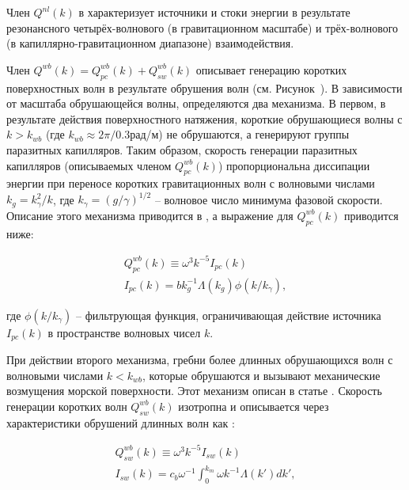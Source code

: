 Член $Q^{nl} (k)$ в  характеризует источники и стоки энергии в результате резонансного четырёх-волнового (в гравитационном масштабе) и трёх-волнового (в капиллярно-гравитационном диапазоне) взаимодействия.

Член $Q^{wb} (k)=Q_{pc}^{wb} (k)+Q_{sw}^{wb} (k)$ описывает генерацию коротких поверхностных волн в результате обрушения волн (см. Рисунок~). В зависимости от масштаба обрушающейся волны, определяются два механизма. В первом, в результате действия поверхностного натяжения, короткие обрушающиеся волны с $k>k_{wb} $ (где $k_{wb} \approx 2\pi /0.3$рад/м) не обрушаются, а генерируют группы паразитных капилляров. Таким образом, скорость генерации паразитных капилляров (описываемых членом $Q_{pc}^{wb} (k)$) пропорциональна диссипации энергии при переносе коротких гравитационных волн с волновыми числами $k_{g} =k_{\gamma }^{2} /k$, где $k_{\gamma } =(g/\gamma )^{1/2} $ -- волновое число минимума фазовой скорости. Описание этого механизма приводится в \citep{1999a,Kudryavtsev2003}, а выражение для $Q_{pc}^{wb} (k)$ приводится ниже:



\begin{equation} \label{1.34)} \begin{array}{l} {Q_{pc}^{wb} (k)\equiv \omega ^{3} k^{-5} I_{pc} (k)} \\ {I_{pc} (k)=bk_{g}^{-1} \Lambda (k_{g} )\phi (k/k_{\gamma } ),} \end{array} \end{equation} 



\noindent где $\phi (k/k_{\gamma } )$ -- фильтрующая функция, ограничивающая действие источника $I_{pc} (k)$ в пространстве волновых чисел $k$.

При действии второго механизма, гребни более длинных обрушающихся волн с волновыми числами $k<k_{wb} $, которые обрушаются и вызывают механические возмущения морской поверхности. Этот механизм описан в статье \citep{Kudryavtsev2004}. Скорость генерации коротких волн $Q_{sw}^{wb} (k)$ изотропна и описывается через характеристики обрушений длинных волн как \citep{Kudryavtsev2004}:



\begin{equation} \label{1.35)} \begin{array}{l} {Q_{sw}^{wb} (k)\equiv \omega ^{3} k^{-5} I_{sw} (k)} \\ {I_{sw} (k)=c_{b} \omega ^{-1} \int _{0}^{k_{m} }\omega k^{-1} \Lambda (k')dk' ,} \end{array} \end{equation} 



